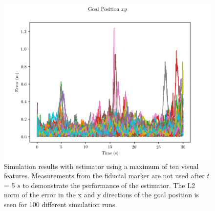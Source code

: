 \begin{figure}
  \centering
  \includegraphics[scale=0.5]{plots/mc_with_lms_xy_err.png}
  \caption{Simulation results with estimator using a maximum of ten visual
  features. Measurements from the fiducial marker are not used after $t$ = 5
$s$ to demonstrate the performance of the estimator. The L2 norm of the error in
the x and y directions of the goal position is seen for 100 different simulation
runs.}
  \label{fig:mc_with_lms_xy_err}
\end{figure}

